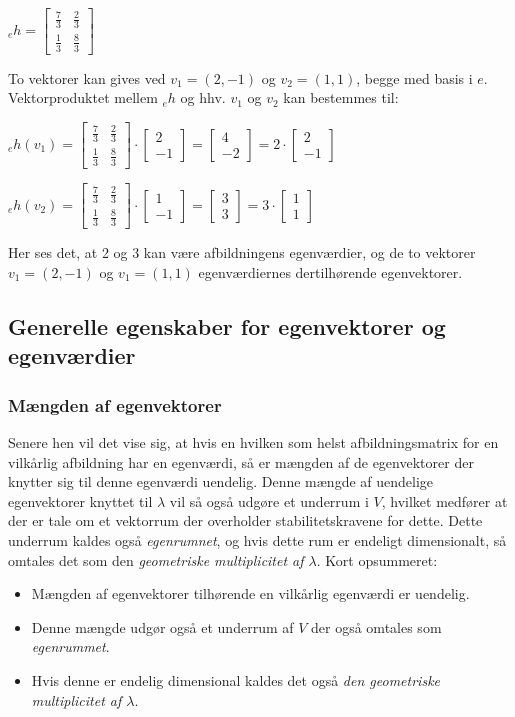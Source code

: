 \documentclass{article}
\newcommand{\cent}[1]{\begin{center}#1\end{center}}
\newcommand{\vekt}[2]{\ensuremath{\begin{bmatrix} #1\\ #2\end{bmatrix}}}
\begin{document}
	\newcommand{\matrixh}{\ensuremath{\begin{bmatrix}
				\frac{7}{3} & \frac{2}{3} \\
				\frac{1}{3} & \frac{8}{3}
	\end{bmatrix}}}
	
	\cent{$ _eh = \matrixh$}
	
	To vektorer kan gives ved $v_1=(2,-1)$ og $v_2=(1,1)$, begge med basis i $e$. Vektorproduktet mellem $_eh$ og hhv. $v_1$ og $v_2$ kan bestemmes til:
	
	\cent{$ _eh(v_1)= \matrixh \cdot \vekt{2}{-1} = \vekt{4}{-2} = 2 \cdot \vekt{2}{-1}$}
	\cent{$ _eh(v_2)= \matrixh \cdot \vekt{1}{-1} = \vekt{3}{3} = 3 \cdot \vekt{1}{1}$}
	
	Her ses det, at 2 og 3 kan være afbildningens egenværdier, og de to vektorer $v_1=(2,-1)$ og $v_1=(1,1)$ egenværdiernes dertilhørende egenvektorer.
	
	\subsection{Generelle egenskaber for egenvektorer og egenværdier}
	\subsubsection{Mængden af egenvektorer}
	Senere hen vil det vise sig, at hvis en hvilken som helst afbildningsmatrix for en vilkårlig afbildning har en egenværdi, så er mængden af de egenvektorer der knytter sig til denne egenværdi uendelig. Denne mængde af uendelige egenvektorer knyttet til $\lambda$ vil så også udgøre et underrum i $V$, hvilket medfører at der er tale om et vektorrum der overholder stabilitetskravene for dette. Dette underrum kaldes også \textit{egenrumnet}, og hvis dette rum er endeligt dimensionalt, så omtales det som den \textit{geometriske multiplicitet af $\lambda$}. \newline
	\newline
	Kort opsummeret:
	
	\begin{itemize}
		\item Mængden af egenvektorer tilhørende en vilkårlig egenværdi er uendelig.
		\item Denne mængde udgør også et underrum af $V$ der også omtales som \textit{egenrummet}.
		\item Hvis denne er endelig dimensional kaldes det også \textit{den geometriske multiplicitet af $\lambda$}.
	\end{itemize}
\end{document}
